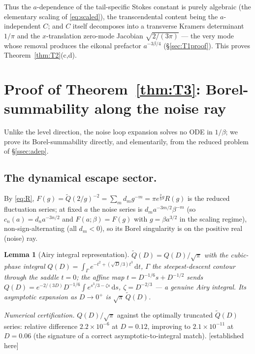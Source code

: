 \documentclass[11pt,reqno]{amsart}
\theoremstyle{plain}
\newtheorem{lemma}[theorem]{Lemma}
\theoremstyle{definition}
\theoremstyle{remark}
\newcommand{\dd}{\,\mathrm{d}}
\newcommand{\tagPr}{{\footnotesize\textsf{[established here]}}}
\begin{document}
Thus the $a$-dependence of the tail-specific Stokes constant is purely algebraic (the elementary
scaling of \eqref{eq:scaled}), the transcendental content being the $a$-independent $C$; and $C$
itself decomposes into a transverse Kramers determinant $1/\pi$ and the $x$-translation zero-mode
Jacobian $\sqrt{2/(3\pi)}$ --- the very mode whose removal produces the eikonal prefactor
$a^{-3\beta/4}$ (\S\ref{sec:T1proof}). This proves Theorem~\ref{thm:T2}(c,d).

\section{Proof of Theorem~\ref{thm:T3}: Borel-summability along the noise ray}\label{sec:noise}

Unlike the level direction, the noise loop expansion solves no ODE in $1/\beta$; we prove its
Borel-summability directly, and elementarily, from the reduced problem of \S\ref{ssec:adep}.

\subsection{The dynamical escape sector.}
By \eqref{eq:R}, $F(g)=\tilde Q(2/g)^{-2}=\sum_m d_m g^{-m}=\pi e^{\frac23 g}R(g)$ is the reduced
fluctuation series; at fixed $a$ the noise series is $d_m a^{-3m/2}\beta^{-m}$ (so
$c_n(a)=d_n a^{-3n/2}$ and $F(a;\beta)=F(g)$ with $g=\beta a^{3/2}$ in the scaling regime),
non-sign-alternating (all $d_m<0$), so its Borel singularity is on the positive real (noise) ray.

\begin{lemma}[Airy integral representation]\label{lem:airy}
$\tilde Q(D)=Q(D)/\sqrt\pi$ with the cubic-phase integral
$Q(D)=\int_\Gamma e^{-t^2+(\sqrt D/3)t^3}\dd t$, $\Gamma$ the steepest-descent contour through the
saddle $t=0$; the affine map $t=D^{-1/6}s+D^{-1/2}$ sends
$Q(D)=e^{-2/(3D)}D^{-1/6}\int e^{s^3/3-\zeta s}\dd s$, $\zeta=D^{-2/3}$ --- a genuine Airy integral. Its
asymptotic expansion as $D\to0^+$ is $\sqrt\pi\,\tilde Q(D)$.
\end{lemma}
\emph{Numerical certification.} $Q(D)/\sqrt\pi$ against the optimally truncated $\tilde Q(D)$ series:
relative difference $2.2\times10^{-6}$ at $D=0.12$, improving to $2.1\times10^{-11}$ at $D=0.06$ (the
signature of a correct asymptotic-to-integral match). \tagPr
\end{document}
